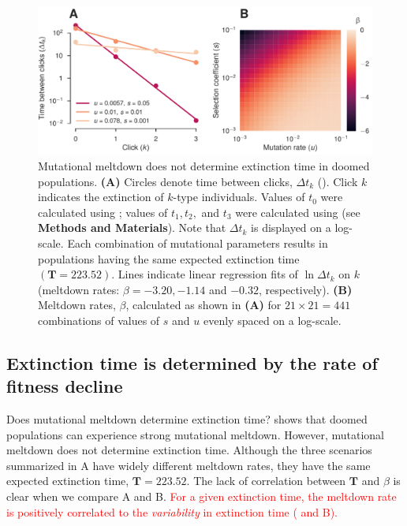 \documentclass[9pt,lineno]{elife}
\newcommand{\red}{\textcolor{red}}
\begin{document}
\begin{figure}[ht!]
\centering
\includegraphics[width=.71\linewidth]{melt.pdf}
\caption{Mutational meltdown does not determine extinction time in doomed populations.  
%
\textbf{(A)} Circles denote time between clicks, $\Delta t_k$ ().  Click $k$ indicates the extinction of $k$-type individuals.  Values of $t_0$ were calculated using ; values of $t_1, t_2,$ and $t_3$ were calculated using  (see \textbf{Methods and Materials}).
Note that $\Delta t_k$ is displayed on a log-scale.  Each combination of mutational parameters results in populations having the same expected extinction time $(\mathbf{T} = 223.52)$.  Lines indicate linear regression fits of $\ln \Delta t_k$ on $k$ (meltdown rates: $\beta = -3.20, -1.14$ and $-0.32$, respectively).
%
\textbf{(B)} Meltdown rates, $\beta$, calculated as shown in \textbf{(A)} for $21\times21=441$ combinations of values of $s$ and $u$ evenly spaced on a log-scale.
}
\label{fig:melt}
\end{figure}


\subsection{Extinction time is determined by the rate of fitness decline}


Does mutational meltdown determine extinction time? 
%
 shows that doomed populations can experience strong mutational meltdown.  However, mutational meltdown does not determine extinction time.  Although the three scenarios summarized in A have widely different meltdown rates, they have the same expected extinction time, $\mathbf{T} = 223.52$.  The lack of correlation between $\mathbf{T}$ and $\beta$ is clear when we compare A and B.
\red{For a given extinction time, the meltdown rate is positively correlated to the \textit{variability} in extinction time ( and B).}
\end{document}
